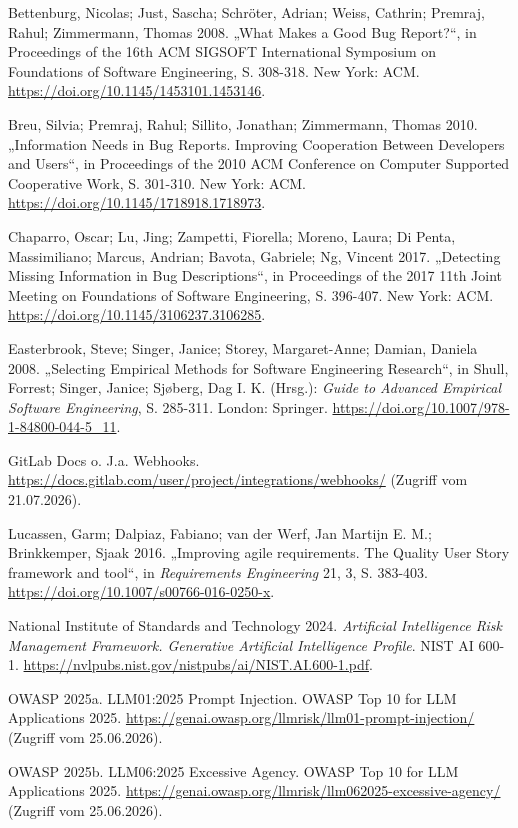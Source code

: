 Bettenburg, Nicolas; Just, Sascha; Schröter, Adrian; Weiss, Cathrin; Premraj, Rahul; Zimmermann, Thomas 2008. „What Makes a Good Bug Report?“, in Proceedings of the 16th ACM SIGSOFT International Symposium on Foundations of Software Engineering, S. 308-318. New York: ACM. \url{https://doi.org/10.1145/1453101.1453146}.

Breu, Silvia; Premraj, Rahul; Sillito, Jonathan; Zimmermann, Thomas 2010. „Information Needs in Bug Reports. Improving Cooperation Between Developers and Users“, in Proceedings of the 2010 ACM Conference on Computer Supported Cooperative Work, S. 301-310. New York: ACM. \url{https://doi.org/10.1145/1718918.1718973}.

Chaparro, Oscar; Lu, Jing; Zampetti, Fiorella; Moreno, Laura; Di Penta, Massimiliano; Marcus, Andrian; Bavota, Gabriele; Ng, Vincent 2017. „Detecting Missing Information in Bug Descriptions“, in Proceedings of the 2017 11th Joint Meeting on Foundations of Software Engineering, S. 396-407. New York: ACM. \url{https://doi.org/10.1145/3106237.3106285}.

Easterbrook, Steve; Singer, Janice; Storey, Margaret-Anne; Damian, Daniela 2008. „Selecting Empirical Methods for Software Engineering Research“, in Shull, Forrest; Singer, Janice; Sjøberg, Dag I. K. (Hrsg.): \emph{Guide to Advanced Empirical Software Engineering}, S. 285-311. London: Springer. \url{https://doi.org/10.1007/978-1-84800-044-5_11}.

GitLab Docs o. J.a. Webhooks. \url{https://docs.gitlab.com/user/project/integrations/webhooks/} (Zugriff vom 21.07.2026).

Lucassen, Garm; Dalpiaz, Fabiano; van der Werf, Jan Martijn E. M.; Brinkkemper, Sjaak 2016. „Improving agile requirements. The Quality User Story framework and tool“, in \emph{Requirements Engineering} 21, 3, S. 383-403. \url{https://doi.org/10.1007/s00766-016-0250-x}.

National Institute of Standards and Technology 2024. \emph{Artificial Intelligence Risk Management Framework. Generative Artificial Intelligence Profile}. NIST AI 600-1. \url{https://nvlpubs.nist.gov/nistpubs/ai/NIST.AI.600-1.pdf}.

OWASP 2025a. LLM01:2025 Prompt Injection. OWASP Top 10 for LLM Applications 2025. \url{https://genai.owasp.org/llmrisk/llm01-prompt-injection/} (Zugriff vom 25.06.2026).

OWASP 2025b. LLM06:2025 Excessive Agency. OWASP Top 10 for LLM Applications 2025. \url{https://genai.owasp.org/llmrisk/llm062025-excessive-agency/} (Zugriff vom 25.06.2026).

